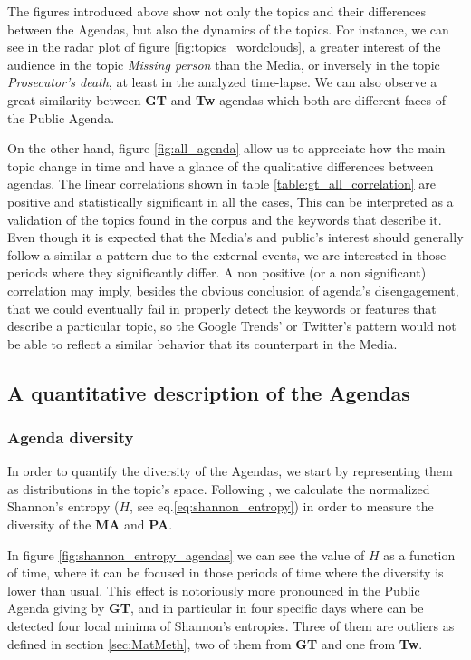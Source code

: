 \documentclass[a4paper, 12pt]{article}
\begin{document}
\par The figures introduced above show not only the topics and their differences between the Agendas, but also the dynamics of the topics.  For instance, we can see in the radar plot of figure \ref{fig:topics_wordclouds}, a greater interest of the audience in the topic \emph{Missing person} than the Media, or inversely in the topic \emph{Prosecutor's death}, at least in the analyzed time-lapse. 
We can also observe a great similarity between \textbf{GT} and \textbf{Tw} agendas which both are different faces of the Public Agenda.

\par On the other hand, figure \ref{fig:all_agenda} allow us to appreciate how the main topic change in time and have a glance of the qualitative differences between agendas.
The linear correlations shown in table \ref{table:gt_all_correlation} are  positive and statistically significant in all the cases, This can be interpreted as a validation of the topics found in the corpus and the keywords that describe it. 
Even though it is expected that the Media's and public's interest should generally follow a similar a pattern due to the external events, we are interested in those periods where they significantly differ. 
A non positive (or a non significant) correlation may imply, besides the obvious conclusion of agenda's disengagement, that we could eventually fail in properly detect the keywords or features that describe a particular topic, so the Google Trends' or Twitter's pattern would not be able to reflect a similar behavior that its counterpart in the Media.

\subsection{A quantitative description of the Agendas}

\subsubsection{Agenda diversity}


\par In order to quantify the diversity of the Agendas, we start by representing them as distributions in the topic's space. 
Following \cite{boydstun2014importance}, we calculate the normalized Shannon's entropy ($H$, see eq.\ref{eq:shannon_entropy}) in order to measure the diversity of the \textbf{MA} and \textbf{PA}.
\par In figure \ref{fig:shannon_entropy_agendas} we can see the value of $H$ as a function of time, where it can be focused in those periods of time where the diversity is lower than usual. This effect is notoriously more pronounced in the Public Agenda giving by \textbf{GT}, and in particular in four specific days  where can be detected four local minima of Shannon's entropies. Three of them are outliers as defined in section \ref{sec:MatMeth}, two of them from \textbf{GT} and one from \textbf{Tw}. 
\end{document}
